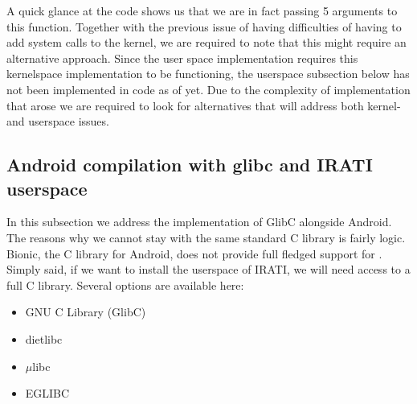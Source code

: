 A quick glance at the code shows us that we are in fact passing 5 arguments to this function. Together with the previous issue of having difficulties of having to add system calls to the kernel, we are required to note that this might require an alternative approach. Since the user space implementation requires this kernelspace implementation to be functioning, the userspace subsection below has not been implemented in code as of yet. Due to the complexity of implementation that arose we are required to look for alternatives that will address both kernel- and userspace issues.

\subsection{Android compilation with glibc and IRATI userspace}


In this subsection we address the implementation of GlibC alongside Android. The reasons why we cannot stay with the same standard C library is fairly logic. Bionic, the C library for Android, does not provide full fledged support for \cpp. Simply said, if we want to install the userspace of IRATI, we will need access to a full C library. Several options are available here:

\begin{itemize}
	\item GNU C Library (GlibC)
	\item dietlibc
	\item $\mu$libc
	\item EGLIBC
\end{itemize}


